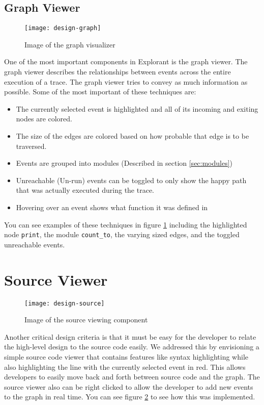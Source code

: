 \subsection{Graph Viewer}
\begin{figure}[!ht]
    \centering
    \texttt{[image: design-graph]}
    \caption{Image of the graph visualizer}
    \label{fig:graph}
\end{figure}
One of the most important components in Explorant is the graph viewer. The graph viewer describes the relationships between events across the entire execution of a trace. The graph viewer tries to convey as much information as possible. Some of the most important of these techniques are: 
\begin{itemize}
    \item The currently selected event is highlighted and all of its incoming and exiting nodes are colored. 
    \item The size of the edges are colored based on how probable that edge is to be traversed. 
    \item Events are grouped into modules (Described in section \ref{sec:modules})
    \item Unreachable (Un-run) events can be toggled to only show the happy path that was actually executed during the trace.
    \item Hovering over an event shows what function it was defined in
\end{itemize}
You can see examples of these techniques in figure \ref{fig:graph} including the highlighted node \texttt{print}, the module \texttt{count\_to}, the varying sized edges, and the toggled unreachable events. 






\section{Source Viewer}
\begin{figure}[!ht]
    \centering
    \texttt{[image: design-source]}
    \caption{Image of the source viewing component}
    \label{fig:graph-src}
\end{figure}
Another critical design criteria is that it must be easy for the developer to relate the high-level design to the source code easily. We addressed this by envisioning a simple source code viewer that contains features like syntax highlighting while also highlighting the line with the currently selected event in red. This allows developers to easily move back and forth between source code and the graph. The source viewer also can be right clicked to allow the developer to add new events to the graph in real time. You can see figure \ref{fig:graph-src} to see how this was implemented.


